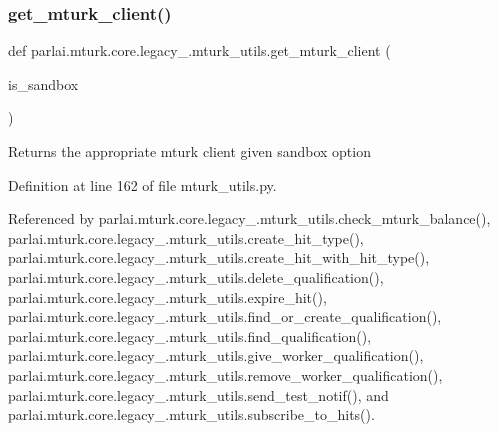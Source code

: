 \subsubsection{\texorpdfstring{get\+\_\+mturk\+\_\+client()}{get\_mturk\_client()}}
{\footnotesize\ttfamily def parlai.\+mturk.\+core.\+legacy\+\_.\+mturk\+\_\+utils.\+get\+\_\+mturk\+\_\+client (\begin{DoxyParamCaption}\item[{}]{is\+\_\+sandbox }\end{DoxyParamCaption})}

\begin{DoxyVerb}Returns the appropriate mturk client given sandbox option\end{DoxyVerb}
 

Definition at line 162 of file mturk\+\_\+utils.\+py.



Referenced by parlai.\+mturk.\+core.\+legacy\+\_.\+mturk\+\_\+utils.\+check\+\_\+mturk\+\_\+balance(), parlai.\+mturk.\+core.\+legacy\+\_.\+mturk\+\_\+utils.\+create\+\_\+hit\+\_\+type(), parlai.\+mturk.\+core.\+legacy\+\_.\+mturk\+\_\+utils.\+create\+\_\+hit\+\_\+with\+\_\+hit\+\_\+type(), parlai.\+mturk.\+core.\+legacy\+\_.\+mturk\+\_\+utils.\+delete\+\_\+qualification(), parlai.\+mturk.\+core.\+legacy\+\_.\+mturk\+\_\+utils.\+expire\+\_\+hit(), parlai.\+mturk.\+core.\+legacy\+\_.\+mturk\+\_\+utils.\+find\+\_\+or\+\_\+create\+\_\+qualification(), parlai.\+mturk.\+core.\+legacy\+\_.\+mturk\+\_\+utils.\+find\+\_\+qualification(), parlai.\+mturk.\+core.\+legacy\+\_.\+mturk\+\_\+utils.\+give\+\_\+worker\+\_\+qualification(), parlai.\+mturk.\+core.\+legacy\+\_.\+mturk\+\_\+utils.\+remove\+\_\+worker\+\_\+qualification(), parlai.\+mturk.\+core.\+legacy\+\_.\+mturk\+\_\+utils.\+send\+\_\+test\+\_\+notif(), and parlai.\+mturk.\+core.\+legacy\+\_.\+mturk\+\_\+utils.\+subscribe\+\_\+to\+\_\+hits().

